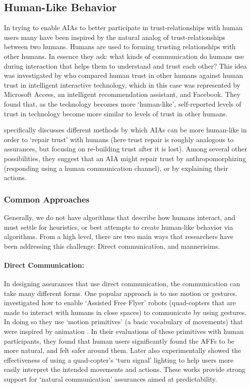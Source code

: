 \subsection{Human-Like Behavior} \label{sec:human_behavior}
In trying to enable AIAs to better participate in trust-relationships with human users many have been inspired by the natural analog of trust-relationships between two humans. Humans are used to forming trusting relationships with other humans. In essence they ask: what kinds of communication do humans use during interaction that helps them to understand and trust each other? This idea was investigated by \cite{Tripp2011-rx} who compared human trust in other humans against human trust in intelligent interactive technology, which in this case was represented by Microsoft Access, an intelligent recommendation assistant, and Facebook. They found that, as the technology becomes more `human-like', self-reported levels of trust in technology become more similar to levels of trust in other humans.

\citet{De_Visser2018-kd} specifically discusses different methods by which AIAs can be more human-like in order to `repair trust' with humans (here trust repair is roughly analogous to assurances, but focusing on re-building trust after it is lost). Among several other possibilities, they suggest that an AIA might repair trust by anthropomorphizing (responding using a human communication channel), or by explaining their actions. 

\subsubsection{Common Approaches}
Generally, we do not have algorithms that describe how humans interact, and must settle for heuristics, or best attempts to create human-like behavior via algorithms. From a high level, there are two main ways that researchers have been addressing this challenge: Direct communication, and mannerisims.

\paragraph{Direct Communication:}
In designing assurances that use direct communication, the communication can take many different forms. One popular approach is to use motion or gestures.\citet{Szafir2014-ok} investigated how to enable `Assisted Free Flyer' robots (quad-copters that are made to interact with humans in close spaces) to communicate by using gestures. In doing so they use `motion primitives' (a basic vocabulary of movements) that were inspired by animation \cite{Van_Breemen2004-rz}. In their evaluations of these primitives with human participants, they found that human users significantly found the AFFs to be more natural, and felt safer around them. Later \citet{Szafir2015-iy} also experimentally showed the effectiveness of using a quad-copter's `turn signal' lighting to help users more easily interpret the intended movements and actions. These works provide strong support for `natural communication' assurances aimed at predictability.

